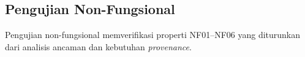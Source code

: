 
\subsection{Pengujian Non-Fungsional}\label{pengujian-non-fungsional}

Pengujian non-fungsional memverifikasi properti NF01--NF06 yang diturunkan dari analisis ancaman dan kebutuhan \textit{provenance}.


